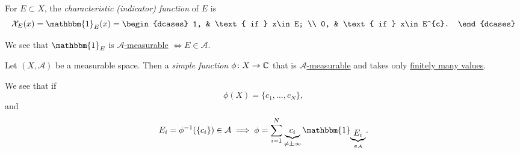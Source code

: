 \begin{definition}\label{def:characteristic-function}
	For \(E\subset X\), the \emph{characteristic (indicator) function} of \(E\) is
	\[
		\mathcal{X} _E (x)= \mathbbm{1}_{E}(x) = \begin{dcases}
			1, & \text{ if }  x\in E;     \\
			0, & \text{ if }  x\in E^{c}.
		\end{dcases}
	\]
\end{definition}
\begin{remark}
	We see that \(\mathbbm{1}_{ E}\) is \hyperref[def:A-measurable-function]{\(\mathcal{A}\)-measurable} \(\iff E\in\mathcal{A}\).
\end{remark}

\begin{definition}\label{def:simple-function}
	Let \((X, \mathcal{A} )\) be a measurable space. Then a \emph{simple function} \(\phi \colon X\to \mathbb{\MakeUppercase{c}} \) that
	is \hyperref[def:A-measurable-function]{\(\mathcal{A} \)-measurable} and takes only \underline{finitely many values}.
\end{definition}
\begin{remark}
	We see that if
	\[
		\phi (X) = \{c_1, \ldots , c_N \},
	\]
	and
	\[
		E_{i}= \phi ^{-1} (\{c_{i}\})\in \mathcal{A} \implies \phi = \sum\limits_{i=1}^{N} \underbrace{c_{i}}_{\neq \pm \infty }\mathbbm{1}_{\underbrace{E_{i}}_{\in \mathcal{A}}}.
	\]
\end{remark}